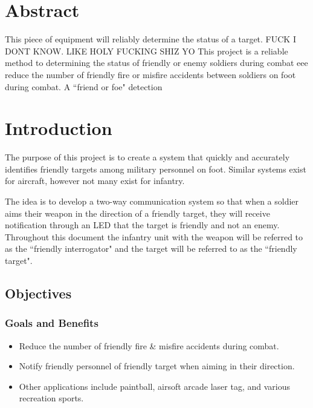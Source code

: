 \documentclass[letterpaper,10pt]{article}
\newcommand{\buildtoc}{
	\clearpage
	\singlespacing
	\tableofcontents
	\onehalfspacing
}
\begin{document}
\maketitle
\pagestyle{fancy}
\begin{spacing}{1.15}


\color{black}
\section*{Abstract}
This piece of equipment will reliably determine the status of a target. FUCK I DONT KNOW. LIKE HOLY FUCKING SHIZ YO This project is a reliable method to determining the status of friendly or enemy soldiers during combat eee reduce the number of friendly fire or misfire accidents between soldiers on foot during combat. A ``friend or foe" detection 
\buildtoc
{}
\clearpage
\setcounter{page}{1}

\section{Introduction}
The purpose of this project is to create a system that quickly and accurately identifies friendly targets among military personnel on foot. Similar systems exist for aircraft, however not many exist for infantry.

The idea is to develop a two-way communication system so that when a soldier aims their weapon in the direction of a friendly target, they will receive notification through an LED that the target is friendly and not an enemy. Throughout this document the infantry unit with the weapon will be referred to as the ``friendly interrogator" and the target will  be referred to as the ``friendly target". 

\subsection{Objectives}
\subsubsection{Goals and Benefits}
\begin{itemize}
	\item Reduce the number of friendly fire \& misfire accidents during combat.
	\item Notify friendly personnel of friendly target when aiming in their direction.
	\item Other applications include paintball, airsoft arcade laser tag, and various recreation sports.
\end{itemize}



\end{spacing}
\end{document}
